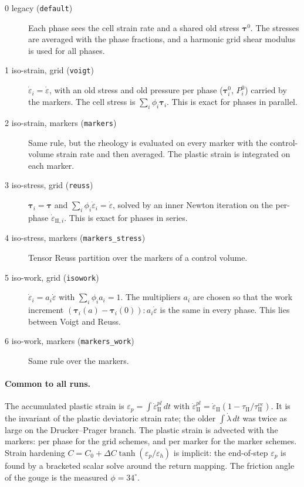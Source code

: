 \documentclass[11pt,a4paper]{article}
\newcommand{\eps}{\varepsilon}
\newcommand{\epsd}{\dot{\varepsilon}}
\begin{document}
\begin{description}
\item[0 legacy (\texttt{default})] Each phase sees the cell strain rate and a shared old stress $\boldsymbol\tau^0$. The stresses are averaged with the phase fractions, and a harmonic grid shear modulus is used for all phases.
\item[1 iso-strain, grid (\texttt{voigt})] $\epsd_i=\epsd$, with an old stress and old pressure per phase ($\boldsymbol\tau^0_i$, $P^0_i$) carried by the markers. The cell stress is $\sum_i\phi_i\boldsymbol\tau_i$. This is exact for phases in parallel.
\item[2 iso-strain, markers (\texttt{markers})] Same rule, but the rheology is evaluated on every marker with the control-volume strain rate and then averaged. The plastic strain is integrated on each marker.
\item[3 iso-stress, grid (\texttt{reuss})] $\boldsymbol\tau_i=\boldsymbol\tau$ and $\sum_i\phi_i\epsd_i=\epsd$, solved by an inner Newton iteration on the per-phase $\epsd_{\mathrm{II},i}$. This is exact for phases in series.
\item[4 iso-stress, markers (\texttt{markers\_stress})] Tensor Reuss partition over the markers of a control volume.
\item[5 iso-work, grid (\texttt{isowork})] $\epsd_i=a_i\epsd$ with $\sum_i\phi_i a_i=1$. The multipliers $a_i$ are chosen so that the work increment $(\boldsymbol\tau_i(a)-\boldsymbol\tau_i(0)):a_i\epsd$ is the same in every phase. This lies between Voigt and Reuss.
\item[6 iso-work, markers (\texttt{markers\_work})] Same rule over the markers.
\end{description}

\paragraph{Common to all runs.} The accumulated plastic strain is $\eps_p=\int\epsd_\mathrm{II}^{pl}\,dt$ with $\epsd^{pl}_\mathrm{II}=\epsd_\mathrm{II}(1-\tau_\mathrm{II}/\tau^{ve}_\mathrm{II})$. It is the invariant of the plastic deviatoric strain rate; the older $\int\dot\lambda\,dt$ was twice as large on the Drucker--Prager branch. The plastic strain is advected with the markers: per phase for the grid schemes, and per marker for the marker schemes. Strain hardening $C=C_0+\Delta C\tanh(\eps_p/\eps_h)$ is implicit: the end-of-step $\eps_p$ is found by a bracketed scalar solve around the return mapping. The friction angle of the gouge is the measured $\phi=34^\circ$.
\end{document}

